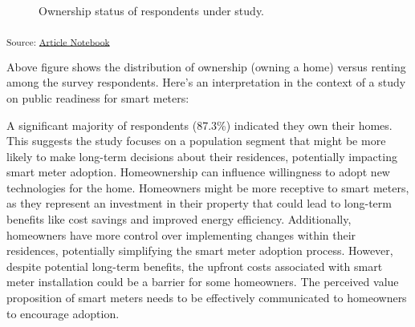 \documentclass[
  letterpaper,
  DIV=11,
  numbers=noendperiod]{scrartcl}
\begin{document}
\begin{figure}[H]


\caption{\label{fig-piechartos}Ownership status of respondents under
study.}

\end{figure}%

\textsubscript{Source:
\href{https://sijuswamyresearch.github.io/SM-project/index.qmd.html}{Article
Notebook}}

Above figure shows the distribution of ownership (owning a home) versus
renting among the survey respondents. Here's an interpretation in the
context of a study on public readiness for smart meters:

A significant majority of respondents (87.3\%) indicated they own their
homes. This suggests the study focuses on a population segment that
might be more likely to make long-term decisions about their residences,
potentially impacting smart meter adoption. Homeownership can influence
willingness to adopt new technologies for the home. Homeowners might be
more receptive to smart meters, as they represent an investment in their
property that could lead to long-term benefits like cost savings and
improved energy efficiency. Additionally, homeowners have more control
over implementing changes within their residences, potentially
simplifying the smart meter adoption process. However, despite potential
long-term benefits, the upfront costs associated with smart meter
installation could be a barrier for some homeowners. The perceived value
proposition of smart meters needs to be effectively communicated to
homeowners to encourage adoption.
\end{document}
